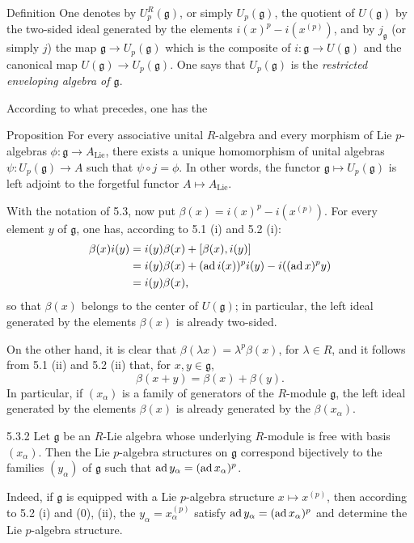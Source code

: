 \begin{enoncerm}{Definition}{}
One denotes by $U_p^R(\mathfrak g)$, or simply $U_p(\mathfrak g)$, the quotient of $U(\mathfrak g)$ by the two-sided ideal generated by the elements $i(x)^p-i(x^{(p)})$, and by $j_{\mathfrak g}$ (or simply $j$) the map $\mathfrak g\to U_p(\mathfrak g)$ which is the composite of $i:\mathfrak g\to U(\mathfrak g)$ and the canonical map $U(\mathfrak g)\to U_p(\mathfrak g)$. One says that $U_p(\mathfrak g)$ is the \emph{restricted enveloping algebra of $\mathfrak g$}.
\end{enoncerm}
According to what precedes, one has the
\begin{enonce}{Proposition}{}
For every associative unital $R$-algebra and every morphism of Lie $p$-algebras $\phi:\mathfrak g\to A_{\mathrm{Lie}}$, there exists a unique homomorphism of unital algebras $\psi:U_p(\mathfrak g)\to A$ such that $\psi\circ j=\phi$. In other words, the functor $\mathfrak g\mapsto U_p(\mathfrak g)$ is left adjoint to the forgetful functor $A\mapsto A_{\mathrm{Lie}}$.
\end{enonce}

With the notation of 5.3, now put $\beta(x)=i(x)^p-i(x^{(p)})$. For every element $y$ of $\mathfrak g$, one has, according to 5.1 (i) and 5.2 (i):
\[
\begin{aligned}
\beta(x)i(y)&=i(y)\beta(x)+[\beta(x),i(y)]\\
&=i(y)\beta(x)+(\operatorname{ad} i(x))^pi(y)-i((\operatorname{ad} x)^py)\\
&=i(y)\beta(x),
\end{aligned}
\]
so that $\beta(x)$ belongs to the center of $U(\mathfrak g)$; in particular, the left ideal generated by the elements $\beta(x)$ is already two-sided.

On the other hand, it is clear that $\beta(\lambda x)=\lambda^p\beta(x)$, for $\lambda\in R$, and it follows from 5.1 (ii) and 5.2 (ii) that, for $x,y\in\mathfrak g$,
\[
\beta(x+y)=\beta(x)+\beta(y).
\]
In particular, if $(x_\alpha)$ is a family of generators of the $R$-module $\mathfrak g$, the left ideal generated by the elements $\beta(x)$ is already generated by the $\beta(x_\alpha)$.

\begin{proposition}{5.3.2}\label{VIIA.5.3.2}
Let $\mathfrak g$ be an $R$-Lie algebra whose underlying $R$-module is free with basis $(x_\alpha)$. Then the Lie $p$-algebra structures on $\mathfrak g$ correspond bijectively to the families $(y_\alpha)$ of $\mathfrak g$ such that $\operatorname{ad} y_\alpha=(\operatorname{ad} x_\alpha)^p$.
\end{proposition}
Indeed, if $\mathfrak g$ is equipped with a Lie $p$-algebra structure $x\mapsto x^{(p)}$, then according to 5.2 (i) and (0), (ii), the $y_\alpha=x_\alpha^{(p)}$ satisfy $\operatorname{ad} y_\alpha=(\operatorname{ad} x_\alpha)^p$ and determine the Lie $p$-algebra structure.

